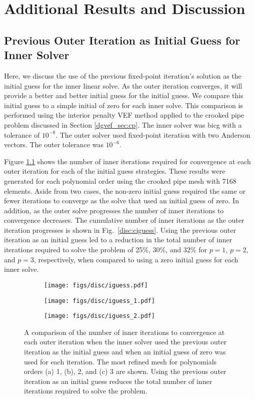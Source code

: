 \documentclass[../doc.tex]{subfiles}
\begin{document}
\chapter{Additional Results and Discussion} \label{chap:disc}
\section{Previous Outer Iteration as Initial Guess for Inner Solver}
Here, we discuss the use of the previous fixed-point iteration's solution as the initial guess for the inner linear solve. As the outer iteration converges, it will provide a better and better initial guess for the initial guess. We compare this initial guess to a simple initial of zero for each inner solve. This comparison is performed using the interior penalty VEF method applied to the crooked pipe problem discussed in Section \ref{dgvef_sec:cp}. The inner solver was \gls{bicg} with a tolerance of $10^{-8}$. The outer solver used fixed-point iteration with two Anderson vectors. The outer tolerance was $10^{-6}$. 

Figure \ref{disc:iguess} shows the number of inner iterations required for convergence at each outer iteration for each of the initial guess strategies. These results were generated for each polynomial order using the crooked pipe mesh with 7168 elements. Aside from two cases, the non-zero initial guess required the same or fewer iterations to converge as the solve that used an initial guess of zero. In addition, as the outer solve progresses the number of inner iterations to convergence decreases. The cumulative number of inner iterations as the outer iteration progresses is shown in Fig.~\ref{disc:ciguess}. Using the previous outer iteration as an initial guess led to a reduction in the total number of inner iterations required to solve the problem of 25\%, 30\%, and 32\%  for $p=1$, $p=2$, and $p=3$, respectively, when compared to using a zero initial guess for each inner solve. 
\begin{figure}
\centering 
\begin{subfigure}{.32\textwidth}
	\centering
	\texttt{[image: figs/disc/iguess.pdf]}
	\caption{}
\end{subfigure}
\begin{subfigure}{.32\textwidth}
	\centering
	\texttt{[image: figs/disc/iguess\_1.pdf]}
	\caption{}
\end{subfigure}
\begin{subfigure}{.32\textwidth}
	\centering
	\texttt{[image: figs/disc/iguess\_2.pdf]}
	\caption{}
\end{subfigure}
\caption{A comparison of the number of inner iterations to convergence at each outer iteration when the inner solver used the previous outer iteration as the initial guess and when an initial guess of zero was used for each iteration. The most refined mesh for polynomials orders (a) 1, (b), 2, and (c) 3 are shown. Using the previous outer iteration as an initial guess reduces the total number of inner iterations required to solve the problem.}
\label{disc:iguess}
\end{figure}
\end{document}
